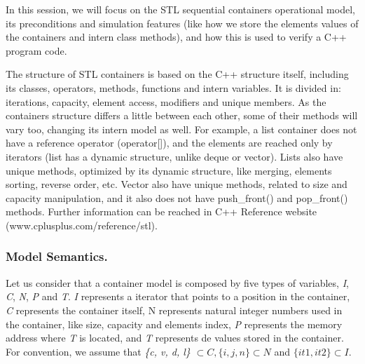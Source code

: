 \documentclass[a4paper]{llncs}
\begin{document}
In this session, we will focus on the STL sequential containers operational model, its preconditions and simulation features (like how we store the elements values of the containers and intern class methods), and how this is used to verify a C++ program code.

	The structure of STL containers is based on the C++ structure itself, including its classes, operators, methods, functions and intern variables. It is divided in: iterations, capacity, element access, modifiers and unique members. As the containers structure differs a little between each other, some of their methods will vary too, changing its intern model as well. For example, a list container does not have a reference operator (operator[]), and the elements are reached only by iterators (list has a dynamic structure, unlike deque or vector). Lists also have unique methods, optimized by its dynamic structure, like merging, elements sorting, reverse order, etc.
	Vector also have unique methods, related to size and capacity manipulation, and it also does not have push\_front() and pop\_front() methods. Further information can be reached in C++ Reference website (www.cplusplus.com/reference/stl).

	
\subsubsection{Model Semantics.}
	
	Let us consider that a container model is composed by five types of variables, \emph{I}, \emph{C}, \emph{N}, \emph{P} and \emph{T}. \emph{I} represents a iterator that points to a position in the container, \emph{C} represents the container itself, N represents natural integer numbers used in the container, like size, capacity and elements index, \emph{P} represents the memory address where \emph{T} is located, and \emph{T} represents de values stored in the container. For convention, we assume that \emph{\{c, v, d, l\}} $\subset C, \{i, j, n\} \subset N$ and $\{it1, it2\} \subset I$. 
	
\end{document}
